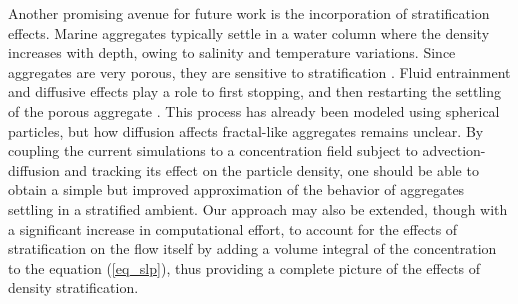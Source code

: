 Another promising avenue for future work is the incorporation of stratification effects. Marine aggregates typically settle in a water column where the density increases with depth, owing to salinity and temperature variations. Since aggregates are very porous, they are sensitive to stratification \cite{prairie_delayed_2013}. 
Fluid entrainment and diffusive effects play a role to first stopping, and then restarting the settling of the porous aggregate
\cite{panah_simulations_2017}. This process has already been modeled using spherical particles, but how diffusion affects fractal-like aggregates remains unclear. By coupling the current simulations to a concentration field subject to advection-diffusion and tracking its effect on the particle density, one should be able to obtain a simple but improved approximation of the behavior of aggregates settling in a stratified ambient. Our approach may also be extended, though with a significant increase in computational effort, to account for the effects of stratification on the flow itself by adding a volume integral of the concentration to the equation (\ref{eq_slp}), thus providing a complete picture of the effects of density stratification.

